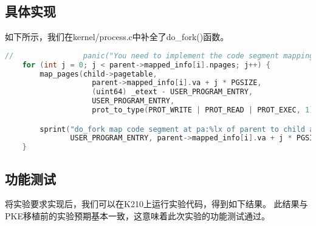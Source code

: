 \subsection{具体实现}

如下所示，我们在kernel/process.c中补全了do\_fork()函数。

\begin{lstlisting}[caption={do\_fork}, label={lst:do_fork}, language=C]
    //                panic("You need to implement the code segment mapping of child in lab3_1.\n");
    for (int j = 0; j < parent->mapped_info[i].npages; j++) {
        map_pages(child->pagetable, 
                    parent->mapped_info[i].va + j * PGSIZE, 
                    (uint64) _etext - USER_PROGRAM_ENTRY,
                    USER_PROGRAM_ENTRY, 
                    prot_to_type(PROT_WRITE | PROT_READ | PROT_EXEC, 1));

        sprint("do_fork map code segment at pa:%lx of parent to child at va:%lx.\n",
               USER_PROGRAM_ENTRY, parent->mapped_info[i].va + j * PGSIZE);
    }    
\end{lstlisting}

\subsection{功能测试}

将实验要求实现后，我们可以在K210上运行实验代码，得到如下结果。
此结果与PKE移植前的实验预期基本一致，这意味着此次实验的功能测试通过。

